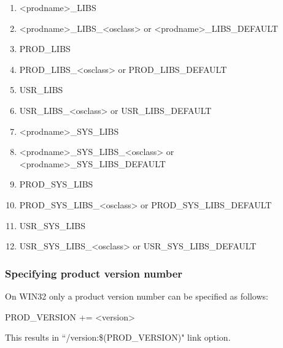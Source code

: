 \begin{enumerate}\item \textless{}prodname\textgreater{}\_LIBS

\item \textless{}prodname\textgreater{}\_LIBS\_\textless{}osclass\textgreater{} or \textless{}prodname\textgreater{}\_LIBS\_DEFAULT

\item {}PROD\_LIBS

\item PROD\_LIBS\_\textless{}osclass\textgreater{} or PROD\_LIBS\_DEFAULT

\item {}USR\_LIBS

\item USR\_LIBS\_\textless{}osclass\textgreater{} or USR\_LIBS\_DEFAULT

\item \textless{}prodname\textgreater{}\_SYS\_LIBS

\item \textless{}prodname\textgreater{}\_SYS\_LIBS\_\textless{}osclass\textgreater{} or \textless{}prodname\textgreater{}\_SYS\_LIBS\_DEFAULT

\item {}PROD\_SYS\_LIBS

\item PROD\_SYS\_LIBS\_\textless{}osclass\textgreater{} or PROD\_SYS\_LIBS\_DEFAULT

\item {}USR\_SYS\_LIBS

\item USR\_SYS\_LIBS\_\textless{}osclass\textgreater{} or USR\_SYS\_LIBS\_DEFAULT

\end{enumerate}\subsubsection{Specifying product version number}

On WIN32 only a product version number can be specified as follows:

\begin{description}\item {}PROD\_VERSION += \textless{}version\textgreater{}

\end{description}This results in ``/version:\$(PROD\_VERSION)" link option.

